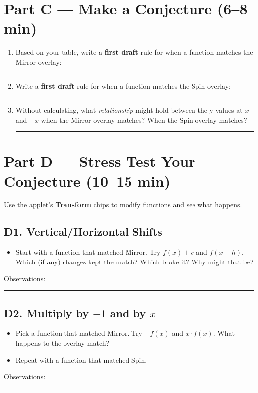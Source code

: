 \documentclass[11pt]{article}
\newcommand{\ruleline}{\par\noindent\rule{\textwidth}{0.4pt}\par}
\begin{document}
\section*{Part C — Make a Conjecture (6--8 min)}
\begin{enumerate}
  \item Based on your table, write a \textbf{first draft} rule for when a function matches the Mirror overlay: \\[0.6em]
  \ruleline
  \item Write a \textbf{first draft} rule for when a function matches the Spin overlay: \\[0.6em]
  \ruleline
  \item Without calculating, what \emph{relationship} might hold between the y-values at \(x\) and \(-x\) when the Mirror overlay matches? When the Spin overlay matches?\\[0.6em]
  \ruleline
\end{enumerate}

\section*{Part D — Stress Test Your Conjecture (10--15 min)}
Use the applet's \textbf{Transform} chips to modify functions and see what happens.

\subsection*{D1. Vertical/Horizontal Shifts}
\begin{itemize}
  \item Start with a function that matched Mirror. Try \(f(x)+c\) and \(f(x-h)\). Which (if any) changes kept the match? Which broke it? Why might that be?
\end{itemize}
\noindent Observations: \\
\ruleline

\subsection*{D2. Multiply by \(-1\) and by \(x\)}
\begin{itemize}
  \item Pick a function that matched Mirror. Try \(-f(x)\) and \(x\cdot f(x)\). What happens to the overlay match?
  \item Repeat with a function that matched Spin.
\end{itemize}
\noindent Observations: \\
\ruleline
\end{document}
